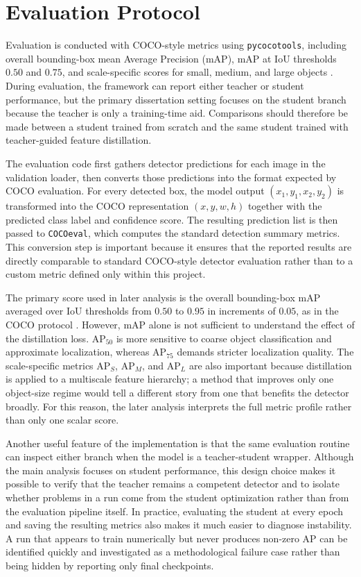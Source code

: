 \section{Evaluation Protocol}

Evaluation is conducted with COCO-style metrics using \texttt{pycocotools}, including overall bounding-box mean Average Precision (mAP), mAP at IoU thresholds $0.50$ and $0.75$, and scale-specific scores for small, medium, and large objects \cite{lin2014coco}. During evaluation, the framework can report either teacher or student performance, but the primary dissertation setting focuses on the student branch because the teacher is only a training-time aid. Comparisons should therefore be made between a student trained from scratch and the same student trained with teacher-guided feature distillation.

The evaluation code first gathers detector predictions for each image in the validation loader, then converts those predictions into the format expected by COCO evaluation. For every detected box, the model output $(x_1,y_1,x_2,y_2)$ is transformed into the COCO representation $(x,y,w,h)$ together with the predicted class label and confidence score. The resulting prediction list is then passed to \texttt{COCOeval}, which computes the standard detection summary metrics. This conversion step is important because it ensures that the reported results are directly comparable to standard COCO-style detector evaluation rather than to a custom metric defined only within this project.

The primary score used in later analysis is the overall bounding-box mAP averaged over IoU thresholds from $0.50$ to $0.95$ in increments of $0.05$, as in the COCO protocol \cite{lin2014coco}. However, mAP alone is not sufficient to understand the effect of the distillation loss. AP$_{50}$ is more sensitive to coarse object classification and approximate localization, whereas AP$_{75}$ demands stricter localization quality. The scale-specific metrics AP$_S$, AP$_M$, and AP$_L$ are also important because distillation is applied to a multiscale feature hierarchy; a method that improves only one object-size regime would tell a different story from one that benefits the detector broadly. For this reason, the later analysis interprets the full metric profile rather than only one scalar score.

Another useful feature of the implementation is that the same evaluation routine can inspect either branch when the model is a teacher-student wrapper. Although the main analysis focuses on student performance, this design choice makes it possible to verify that the teacher remains a competent detector and to isolate whether problems in a run come from the student optimization rather than from the evaluation pipeline itself. In practice, evaluating the student at every epoch and saving the resulting metrics also makes it much easier to diagnose instability. A run that appears to train numerically but never produces non-zero AP can be identified quickly and investigated as a methodological failure case rather than being hidden by reporting only final checkpoints.

